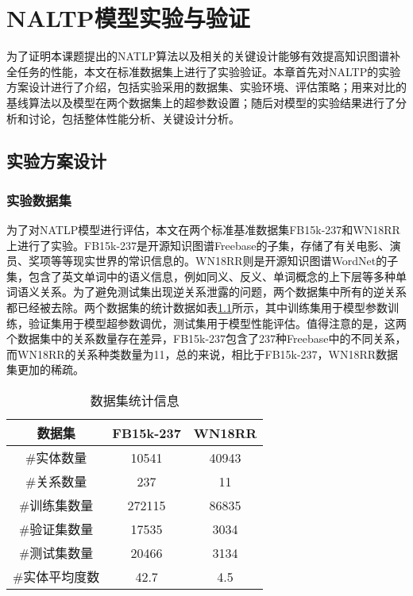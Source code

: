 \chapter{NALTP模型实验与验证}

为了证明本课题提出的NATLP算法以及相关的关键设计能够有效提高知识图谱补全任务的性能，本文在标准数据集上进行了实验验证。本章首先对NALTP的实验方案设计进行了介绍，包括实验采用的数据集、实验环境、评估策略；用来对比的基线算法以及模型在两个数据集上的超参数设置；随后对模型的实验结果进行了分析和讨论，包括整体性能分析、关键设计分析。

\section{实验方案设计}

\subsection{实验数据集}
为了对NATLP模型进行评估，本文在两个标准基准数据集FB15k-237和WN18RR上进行了实验。FB15k-237是开源知识图谱Freebase的子集，存储了有关电影、演员、奖项等等现实世界的常识信息的。WN18RR则是开源知识图谱WordNet的子集，包含了英文单词中的语义信息，例如同义、反义、单词概念的上下层等多种单词语义关系。为了避免测试集出现逆关系泄露的问题，两个数据集中所有的逆关系都已经被去除。两个数据集的统计数据如表\ref{dataset_statistics}所示，其中训练集用于模型参数训练，验证集用于模型超参数调优，测试集用于模型性能评估。值得注意的是，这两个数据集中的关系数量存在差异，FB15k-237包含了237种Freebase中的不同关系，而WN18RR的关系种类数量为11，总的来说，相比于FB15k-237，WN18RR数据集更加的稀疏。

\begin{table}[htbp]
  \renewcommand\arraystretch{1.5}
  \caption{数据集统计信息}
  \centering
  \begin{tabular}{*{3}{c}}
    \toprule
    数据集 & FB15k-237 & WN18RR\\
    \midrule
    \#实体数量  & 10541 & 40943 \\
    \#关系数量 & 237 & 11\\
    \#训练集数量 & 272115 &86835\\
    \#验证集数量 &17535 &3034\\
    \#测试集数量 &20466 &3134\\
    \#实体平均度数 &42.7 &4.5\\
    \bottomrule
  \end{tabular}
  \label{dataset_statistics}
\end{table}

